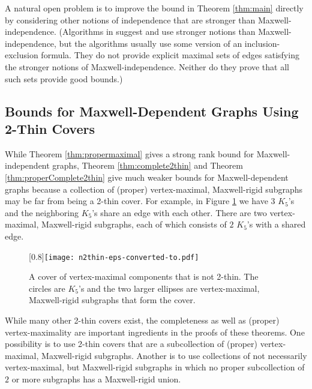 \documentclass[10pt]{article}
\begin{document}
\medskip\noindent
A natural open problem is to improve the bound in Theorem \ref{thm:main} directly by considering other
notions of independence that are stronger than Maxwell-independence. (Algorithms in \cite{sitharam:zhou:tractableADG:2004, bib:survey}
suggest and use stronger notions than Maxwell-independence,
but the algorithms usually
use some version of an inclusion-exclusion formula. They do not
provide explicit maximal sets of edges satisfying the stronger notions of
Maxwell-independence.
Neither do they prove that all such sets provide good bounds.)


\subsection{Bounds for Maxwell-Dependent Graphs Using 2-Thin Covers}\label{sec:Maxwelldependent}

\medskip\noindent While Theorem \ref{thm:propermaximal} gives a strong rank bound for Maxwell-independent graphs, Theorem \ref{thm:complete2thin} and Theorem \ref{thm:properComplete2thin} give much weaker bounds for Maxwell-dependent graphs because a collection of (proper) vertex-maximal, Maxwell-rigid subgraphs may be far from being a 2-thin cover. For example, in Figure \ref{fig:n2thin} we have $3$ $K_5$'s and the neighboring $K_5$'s share an edge with each other. There are two vertex-maximal, Maxwell-rigid subgraphs, each of which consists of $2$ $K_5$'s with a shared edge.

\begin{center}
\begin{figure}[!h]
\begin{center}
\scalebox{0.8}[0.8]{\texttt{[image: n2thin-eps-converted-to.pdf]}}
\end{center}
\caption{A cover of vertex-maximal components that is not 2-thin. The circles are $K_5$'s and the two larger ellipses are vertex-maximal, Maxwell-rigid subgraphs that form the cover.}
\label{fig:n2thin}
\end{figure}
\end{center}

\medskip\noindent
While many other 2-thin covers exist, the completeness as well as (proper) vertex-maximality
are important ingredients in the proofs of these theorems.
One possibility is to use 2-thin covers that are a subcollection of
(proper) vertex-maximal, Maxwell-rigid subgraphs. Another is to use collections of not necessarily vertex-maximal, but Maxwell-rigid subgraphs in which no proper subcollection of $2$ or more subgraphs has a Maxwell-rigid union.
\end{document}
